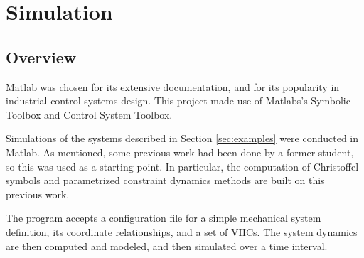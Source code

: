 \documentclass[main.tex]{subfiles}
\begin{document}
\section{Simulation}
\subsection{Overview}
Matlab was chosen for its extensive documentation, and for its popularity in industrial control systems design. This project made use of Matlabs's Symbolic Toolbox and Control System Toolbox.

Simulations of the systems described in Section \ref{sec:examples} were conducted in Matlab. As mentioned, some previous work had been done by a former student, so this was used as a starting point. In particular, the computation of Christoffel symbols and parametrized constraint dynamics methods are built on this previous work. 

The program accepts a configuration file for a simple mechanical system definition, its coordinate relationships, and a set of VHCs. The system dynamics are then computed and modeled, and then simulated over a time interval. 
\end{document}
